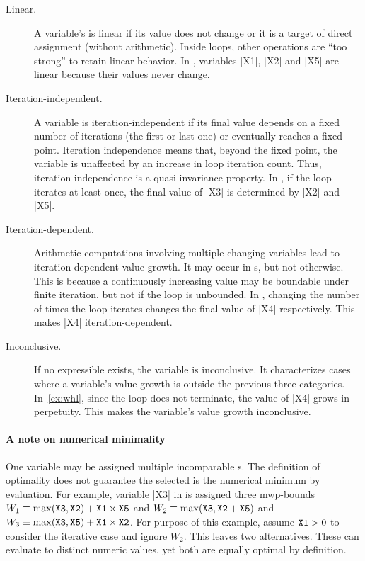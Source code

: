 \begin{description}

\item[Linear.]
A variable's  is linear if its value does not change or it is
a target of direct assignment (without arithmetic). Inside loops, other
operations are \enquote{too strong} to retain linear behavior. In \exname,
variables \pr|X1|, \pr|X2| and \pr|X5| are linear because their values never
change.

\item[Iteration-independent.]
A variable is iteration-independent if its final value depends on a fixed
number of iterations (\eg the first or last one) or eventually reaches a
fixed point. Iteration independence means
that, beyond the fixed point, the variable is unaffected by an increase in
loop iteration count. Thus, iteration-independence is
a quasi-invariance property. In \exname, if the loop
iterates at least once, the final value of \pr|X3| is determined by \pr|X2|
and \pr|X5|.

\item[Iteration-dependent.]
Arithmetic computations involving multiple changing variables lead to
iteration-dependent value growth. It may occur
in s, but not otherwise. This is because a continuously
increasing value may be boundable under finite iteration, but not if the
loop is unbounded. In \explain, changing the number of
times the loop iterates changes the final value of \pr|X4| respectively.
This makes \pr|X4| iteration-dependent.

\item[Inconclusive.]
If no expressible  exists, the variable is inconclusive.
It characterizes cases where a variable's value growth is outside the
previous three categories. In~\autoref{ex:whl}, since the loop does not
terminate, the value of \pr|X4| grows in perpetuity. This makes the
variable's value growth inconclusive.

\end{description}

\paragraph*{A note on numerical minimality}
One variable may be assigned multiple incomparable s. The
definition of optimality does not guarantee the
selected  is the numerical minimum by evaluation. For
example, variable \pr|X3| in \exname is assigned three mwp-bounds \(W_1 \equiv
\max(\prm{X3},\prm{X2})+\prm{X1} \times \prm{X5} \) and \(W_2 \equiv
\max(\prm{X3},\prm{X2}+\prm{X5}) \) and \(W_3 \equiv
\max(\prm{X3},\prm{X5})+\prm{X1} \times \prm{X2} \).
For purpose of this example, assume \(\prm{X1}>0\) to consider the iterative
case and ignore \(W_2\). This leaves two alternatives. These can
evaluate to distinct numeric values, yet both are equally optimal by
definition.

